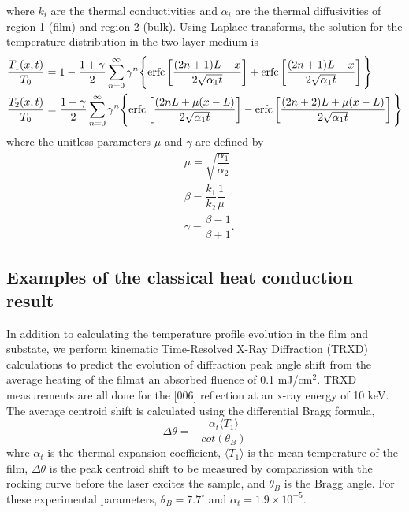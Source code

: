\documentclass[letterpaper,11pt]{article}
\begin{document}
where $k_i$ are the thermal conductivities and $\alpha_i$ are the thermal diffusivities of region 1 (film) and region 2 (bulk).  
Using Laplace transforms, the solution for the temperature distribution in the two-layer medium is
\begin{subequations}
\begin{align}
& \dfrac{T_1(x,t)}{T_0}=1-\dfrac{1+\gamma}{2}\sum\limits_{n=0}^\infty \gamma^n \Bigg\{ \textnormal{erfc} \left[ \dfrac{(2n+1)L-x}{2\sqrt{\alpha_1 t}} \right] + \textnormal{erfc} \left[ \dfrac{(2n+1)L-x}{2\sqrt{\alpha_1 t}} \right] \Bigg\}  \\
& \dfrac{T_2(x,t)}{T_0}=\dfrac{1+\gamma}{2}\sum\limits_{n=0}^\infty \gamma^n \Bigg\{ \textnormal{erfc} \left[ \dfrac{(2nL+\mu(x-L)}{2\sqrt{\alpha_1 t}} \right] - \textnormal{erfc} \left[ \dfrac{(2n+2)L+\mu(x-L)}{2\sqrt{\alpha_1 t}} \right] \Bigg\} 
\end{align}
\end{subequations}
where the unitless parameters $\mu$ and $\gamma$ are defined by
\begin{subequations}
\begin{align}
& \mu = \sqrt{\dfrac{\alpha_1}{\alpha_2}} \\
& \beta = \dfrac{k_1}{k_2} \dfrac{1}{\mu} \\
& \gamma = \dfrac{\beta -1}{\beta+1} .
\end{align}
\end{subequations}

\subsection{Examples of the classical heat conduction result}
In addition to calculating the temperature profile evolution in the film and substate, we perform kinematic Time-Resolved X-Ray Diffraction (TRXD) calculations to predict the evolution of diffraction peak angle shift from the average heating of the filmat an absorbed fluence of 0.1 mJ/cm$^2$.  TRXD measurements are all done for the [006] reflection at an x-ray energy of 10 keV. The average centroid shift is calculated using the differential Bragg formula, 
\begin{equation}
\Delta \theta = - \dfrac{\alpha_t \langle T_1 \rangle}{cot(\theta_B)}
\end{equation}
whre $\alpha_t$ is the thermal expansion coefficient, $\langle T_1 \rangle$ is the mean temperature of the film, $\Delta \theta$ is the peak centroid shift to be measured by comparission with the rocking curve before the laser excites the sample, and $\theta_B$ is the Bragg angle. For these experimental parameters, $\theta_B = 7.7^{\circ}$ and $\alpha_t = 1.9 \times 10^{-5}$.
\pagebreak
\end{document}
